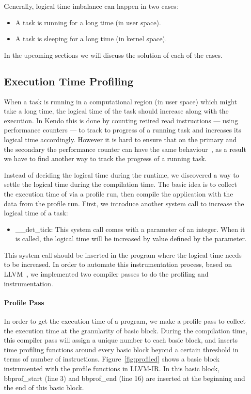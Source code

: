 Generally, logical time imbalance can happen in two cases:
\begin{itemize}
  \item A task is running for a long time (in user space).
  \item A task is sleeping for a long time (in kernel space).
\end{itemize}

In the upcoming sections we will discuss the solution of each of the cases.
\subsection{Execution Time Profiling}
When a task is running in a computational region (in user space) which might take a long time, the logical time of the task should increase along with the execution. In Kendo this is done by counting retired read instructions — using performance counters — to track to progress of a running task and increases its logical time accordingly. However it is hard to ensure that on the primary and the secondary the performance counter can have the same behaviour~\cite{weaver2008can}, as a result we have to find another way to track the progress of a running task.

Instead of deciding the logical time during the runtime, we discovered a way to settle the logical time during the compilation time. The basic idea is to collect the execution time of via a profile run, then compile the application with the data from the profile run. First, we introduce another system call to increase the logical time of a task:

\begin{itemize}
   \item \_\_det\_tick: This system call comes with a parameter of an integer. When it is called, the logical time will be increased by value defined by the parameter.
\end{itemize}

This system call should be inserted in the program where the logical time needs to be increased. In order to automate this instrumentation process, based on LLVM~\cite{lattner2004llvm}, we implemented two compiler passes to do the profiling and instrumentation.


\paragraph{Profile Pass}
In order to get the execution time of a program, we make a profile pass to collect the execution time at the granularity of basic block. During the compilation time, this compiler pass will assign a unique number to each basic block, and inserts time profiling functions around every basic block beyond a certain threshold in terms of number of instructions. Figure~\ref{fig:profiled} shows a basic block instrumented with the profile functions in LLVM-IR. In this basic block, bbprof\_start (line 3) and bbprof\_end (line 16) are inserted at the beginning and the end of this basic block.

